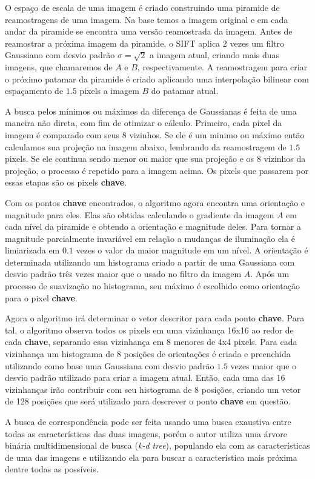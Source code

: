   O espaço de escala de uma imagem é criado construindo uma piramide de reamostragens de uma imagem. Na base temos a 
imagem original e em cada andar da piramide se encontra uma versão reamostrada da imagem. Antes de reamostrar a próxima 
imagem da piramide, o SIFT aplica 2 vezes um filtro Gaussiano com desvio padrão $\sigma = \sqrt{2}$ a imagem atual, 
criando mais duas imagens, que chamaremos de $A$ e $B$, respectivamente. A reamostragem para criar o próximo patamar da 
piramide é criado aplicando uma interpolação bilinear com espaçamento de $1.5$ pixels a imagem $B$ do patamar atual.
 
  A busca pelos mínimos ou máximos da diferença de Gaussianas é feita de uma maneira não direta, com fim de otimizar
o cálculo. Primeiro, cada pixel da imagem é comparado com seus 8 vizinhos. Se ele é um minimo ou máximo então calculamos
sua projeção na imagem abaixo, lembrando da reamostragem de $1.5$ pixels. Se ele continua sendo menor ou maior que sua 
projeção e os 8 vizinhos da projeção, o processo é repetido para a imagem acima. Os pixels que passarem por essas 
etapas são os pixels \textbf{chave}.

  Com os pontos \textbf{chave} encontrados, o algoritmo agora encontra uma orientação e magnitude para eles. Elas são
obtidas calculando o gradiente da imagem $A$ em cada nível da piramide e obtendo a orientação e magnitude deles. Para
tornar a magnitude parcialmente invariável em relação a mudanças de iluminação ela é limiarizada em $0.1$ vezes o valor
da maior magnitude em um nível. A orientação é determinada utilizando um histograma criado a partir de uma Gaussiana
com desvio padrão três vezes maior que o usado no filtro da imagem $A$. Após um processo de suavização no histograma,
seu máximo é escolhido como orientação para o pixel \textbf{chave}. 

  Agora o algoritmo irá determinar o vetor descritor para cada ponto \textbf{chave}. Para tal, o algoritmo observa todos
os pixels em uma vizinhança 16x16 ao redor de cada \textbf{chave}, separando essa vizinhança em 8 menores de 4x4 pixels.
Para cada vizinhança um histograma de 8 posições de orientações é criada e preenchida utilizando como base uma Gaussiana
com desvio padrão $1.5$ vezes maior que o desvio padrão utilizado para criar a imagem atual. Então, cada uma das 16
vizinhanças irão contribuir com seu histograma de 8 posições, criando um vetor de 128 posições que será utilizado
para descrever o ponto \textbf{chave} em questão. 

  A busca de correspondência pode ser feita usando uma busca exaustiva entre todas as características das duas imagens,
porém o autor utiliza uma árvore binária multidimensional de busca (\textit{k-d tree}), populando ela com as 
características de uma das imagens e utilizando ela para buscar a característica mais próxima dentre todas as possíveis.

